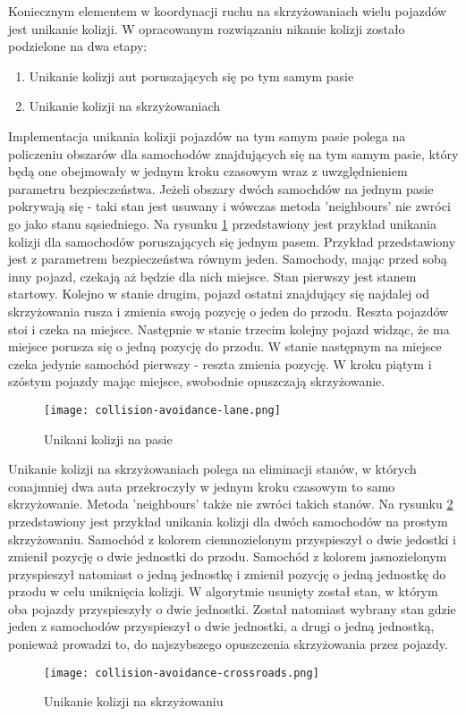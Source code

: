 Koniecznym elementem w koordynacji ruchu na skrzyżowaniach wielu pojazdów jest unikanie kolizji. W opracowanym rozwiązaniu nikanie kolizji zostało podzielone na dwa etapy:
\begin{enumerate}
\item Unikanie kolizji aut poruszających się po tym samym pasie
\item Unikanie kolizji na skrzyżowaniach
\end{enumerate}
Implementacja unikania kolizji pojazdów na tym samym pasie polega na policzeniu obszarów dla samochodów znajdujących się na tym samym pasie, który będą one obejmowały w jednym kroku czasowym wraz z uwzględnieniem parametru bezpieczeństwa. Jeżeli obszary dwóch samochdów na jednym pasie pokrywają się - taki stan jest usuwany i wówczas metoda 'neighbours' nie zwróci go jako stanu sąsiedniego. Na rysunku \ref{collision-avoidance-lane} przedstawiony jest przykład unikania kolizji dla samochodów poruszających się jednym pasem. Przykład przedstawiony jest z parametrem bezpieczeństwa równym jeden. Samochody, mając przed sobą inny pojazd, czekają aż będzie dla nich miejsce. Stan pierwszy jest stanem startowy. Kolejno w stanie drugim, pojazd ostatni znajdujący się najdalej od skrzyżowania rusza i zmienia swoją pozycję o jeden do przodu. Reszta pojazdów stoi i czeka na miejsce. Następnie w stanie trzecim kolejny pojazd widząc, że ma miejsce porusza się o jedną pozycję do przodu. W stanie następnym na miejsce czeka jedynie samochód pierwszy - reszta zmienia pozycję. W kroku piątym i szóstym pojazdy mając miejsce, swobodnie opuszczają skrzyżowanie.
\begin{figure}
    \texttt{[image: collision-avoidance-lane.png]}
  \caption{Unikani kolizji na pasie}
  \label{collision-avoidance-lane}
\end{figure}
\newpage
Unikanie kolizji na skrzyżowaniach polega na eliminacji stanów, w których conajmniej dwa auta przekroczyły w jednym kroku czasowym to samo skrzyżowanie. Metoda 'neighbours' także nie zwróci takich stanów. Na rysunku \ref{collision-avoidance-crossroads} przedstawiony jest przykład unikania kolizji dla dwóch samochodów na prostym skrzyżowaniu. Samochód z kolorem ciemnozielonym przyspieszył o dwie jedostki i zmienił pozycję o dwie jednostki do przodu. Samochód z kolorem jasnozielonym przyspieszył natomiast o jedną jednostkę i zmienił pozycję o jedną jednostkę do przodu w celu uniknięcia kolizji. W algorytmie usunięty został stan, w którym oba pojazdy przyspieszyły o dwie jednostki. Został natomiast wybrany stan gdzie jeden z samochodów przyspieszył o dwie jednostki, a drugi o jedną jednostką, ponieważ prowadzi to, do najszybszego opuszczenia skrzyżowania przez pojazdy.
\begin{figure}
    \texttt{[image: collision-avoidance-crossroads.png]}
  \caption{Unikanie kolizji na skrzyżowaniu}
  \label{collision-avoidance-crossroads}
\end{figure}
\newpage

